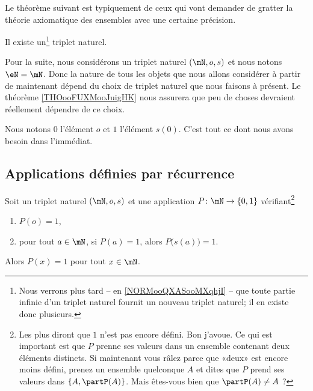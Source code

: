 \begin{normaltext}	\label{NORMooTripletNaturelGratterTheoEns}
	Le théorème suivant est typiquement de ceux qui vont demander de gratter la théorie axiomatique des ensembles avec une certaine précision.
\end{normaltext}

\begin{theorem}     \label{THOooOXMHooXYgMqb}
	Il existe un\footnote{Nous verrons plus tard -- en \ref{NORMooQXASooMXqhjI} %
		-- que toute partie infinie d'un triplet naturel fournit un nouveau triplet naturel; il en existe donc plusieurs.} triplet naturel.
\end{theorem}

\begin{normaltext}[Définition de \( \eN\)]    \label{NORooDefinitionNChoixTriplet}
	Pour la suite, nous considérons un triplet naturel \( (\mN,o,s)\) et nous notons \( \eN=\mN\). Donc la nature de tous les objets que nous allons considérer à partir de maintenant dépend du choix de triplet naturel que nous faisons à présent. Le théorème \ref{THOooFUXMooJuigHK} nous assurera que peu de choses devraient réellement dépendre de ce choix.

	Nous notons \( 0\) l'élément \( o\) et \( 1\) l'élément \( s(0)\). C'est tout ce dont nous avons besoin dans l'immédiat.
\end{normaltext}

\subsection{Applications définies par récurrence}
\label{SUBooApplicationRecurrence}

\begin{proposition}      \label{PROPooXTRCooKwrWkq}
	Soit un triplet naturel \( (\mN,o,s)\) et une application \( P\colon \mN\to \{ 0,1 \}\) vérifiant\footnote{Les plus  diront que \( 1\) n'est pas encore défini. Bon j'avoue. Ce qui est important est que \( P\) prenne ses valeurs dans un ensemble contenant deux éléments distincts. Si maintenant vous râlez parce que «deux» est encore moins défini, prenez un ensemble quelconque \( A\) et dites que \( P\) prend ses valeurs dans \( \{ A, \partP(A)\}\). Mais êtes-vous bien  que \( \partP(A)\neq A\) ?}
	\begin{enumerate}
		\item
		      \( P(o)=1\),
		\item
		      pour tout \( a\in \mN\), si \( P(a)=1\), alors \( P\big( s(a) \big)=1\).
	\end{enumerate}
	Alors \( P(x)=1\) pour tout \( x\in \mN\).
\end{proposition}

